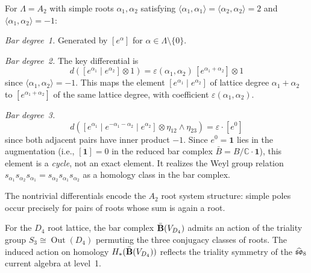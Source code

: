 \begin{computation}\label{comp:lattice:bar-A2}
For $\Lambda = A_2$ with simple roots $\alpha_1, \alpha_2$ satisfying
$\langle\alpha_1,\alpha_1\rangle = \langle\alpha_2,\alpha_2\rangle = 2$
and $\langle\alpha_1,\alpha_2\rangle = -1$:

\emph{Bar degree~1.} Generated by $[e^\alpha]$ for
$\alpha \in \Lambda \setminus \{0\}$.

\emph{Bar degree~2.} The key differential is
\[
d([e^{\alpha_1} \mid e^{\alpha_2}] \otimes 1)
= \varepsilon(\alpha_1,\alpha_2)\,[e^{\alpha_1+\alpha_2}] \otimes 1
\]
since $\langle\alpha_1,\alpha_2\rangle = -1$. This maps the element
$[e^{\alpha_1} \mid e^{\alpha_2}]$ of lattice degree
$\alpha_1 + \alpha_2$ to $[e^{\alpha_1+\alpha_2}]$ of the same lattice
degree, with coefficient $\varepsilon(\alpha_1,\alpha_2)$.

\emph{Bar degree~3.}
\[
d([e^{\alpha_1} \mid e^{-\alpha_1-\alpha_2} \mid e^{\alpha_2}]
\otimes \eta_{12} \wedge \eta_{23})
= \varepsilon \cdot [e^0]
\]
since both adjacent pairs have inner product $-1$.  Since $e^0 = \mathbf{1}$ lies in the augmentation (i.e., $[\mathbf{1}] = 0$ in the reduced bar complex $\bar{B} = B/\mathbb{C}\cdot\mathbf{1}$), this element is a \emph{cycle}, not an exact element.  It realizes the Weyl group relation $s_{\alpha_1} s_{\alpha_2} s_{\alpha_1} = s_{\alpha_2} s_{\alpha_1} s_{\alpha_2}$ as a homology class in the bar complex.

The nontrivial differentials encode the $A_2$ root system structure:
simple poles occur precisely for pairs of roots whose sum is again a root.
\end{computation}

\begin{proposition}
\label{prop:lattice:bar-D4}
For the $D_4$ root lattice, the bar complex
$\bar{\mathbf{B}}(V_{D_4})$ admits an action of the triality group
$S_3 \cong \operatorname{Out}(D_4)$ permuting the three conjugacy classes of
roots. The induced action on homology
$H_*(\bar{\mathbf{B}}(V_{D_4}))$ reflects the triality symmetry of the
$\widehat{\mathfrak{so}}_8$ current algebra at level~1.
\end{proposition}

